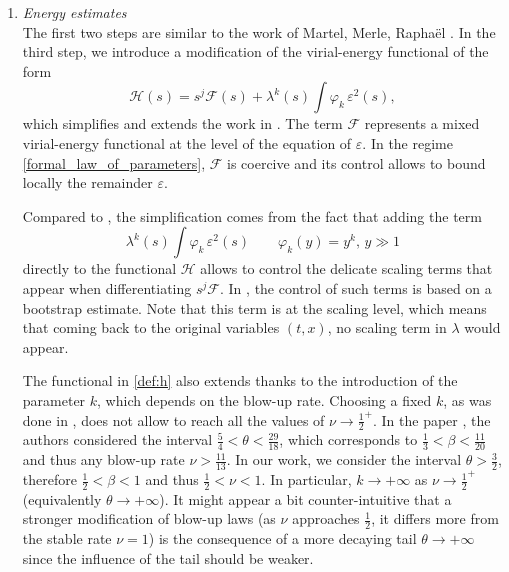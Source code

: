 \documentclass[16pt,english, oneside,reqno]{smfart}
\newcommand{\vare}{{\varepsilon}}
\newcommand{\vphi}{{\varphi}}
\begin{document}
\begin{enumerate}
    \item \textit{Energy estimates}\\
    The first two steps are similar to the work of Martel, Merle, Rapha\"el \cite{MMPIII}.
    In the third step, we introduce a modification of the virial-energy functional of the form
    \begin{equation}\label{def:h}
        \mathcal{H}(s) = s^{j}\mathcal{F}(s) + \lambda^k(s)\int \vphi_k\,\vare^2(s),
    \end{equation}
    which simplifies and extends the work in \cite{MMPI,MMPII,MMPIII}. 
    The term $\mathcal{F}$ represents a mixed virial-energy functional at the level of the equation of $\vare$. In the regime \eqref{formal_law_of_parameters}, $\mathcal{F}$ is coercive and its control allows to bound locally the remainder $\vare$.
    
    Compared to \cite{MMPIII}, the simplification comes from the fact that adding the term 
    \begin{equation*}
        \lambda^k(s)\int \vphi_k\,\vare^2(s) \qquad \vphi_k(y) = y^{k},\, y \gg 1
    \end{equation*}
    directly to the functional $\mathcal{H}$
    allows to control the delicate scaling terms that appear when differentiating $s^{j}\mathcal{F}$. In \cite{MMPIII}, the control of such terms is based on a bootstrap 
    estimate. Note that this term is at the scaling level, which means that coming back to the original variables $(t,x)$, no scaling term in $\lambda$ would appear.
    
    The functional in \eqref{def:h} also extends \cite{MMPIII} thanks to the introduction of the parameter $k$, which depends on the blow-up rate.
    Choosing a fixed $k$, as was done in \cite{MMPIII}, does not allow to reach all the values of $\nu \to \frac 12^{+}$. In the paper \cite{MMPIII}, the authors considered the interval $\frac 54< \theta < \frac{29}{18}$, which corresponds to $\frac 13<\beta< \frac{11}{20}$ and thus any blow-up rate $\nu > \frac{11}{13}$. In our work, we consider the interval $\theta>\frac 32$, therefore $\frac 12<\beta< 1$ and thus $\frac 12< \nu < 1$.
    In particular, $k \to +\infty$ as $\nu \to \frac 12^{+}$ (equivalently $\theta\to+\infty$).
    It might appear a bit counter-intuitive that a stronger modification of blow-up laws
    (as $\nu$ approaches $\frac 12$, it differs more from the stable rate $\nu=1$)
    is the consequence of a more decaying tail $\theta\to +\infty$ since the influence of the tail should be weaker.
    

\end{enumerate}
\end{document}
